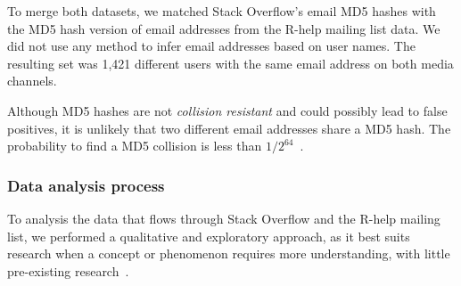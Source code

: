 \documentclass{sig-alternate-05-2015}
\begin{document}

To merge both datasets, we matched Stack Overflow's email MD5 hashes with the MD5 hash version of email addresses from the R-help mailing list data.
We did not use any method to infer email addresses based on user names.
The resulting set was 1,421 different users with the same email address on both media channels.


Although MD5 hashes are not \textit{collision resistant} and could possibly lead to false positives, it is unlikely that two different email addresses share a MD5 hash.
    The probability to find a MD5 collision is less than $1/2^{64}$~\cite{Rivest1992}.

\subsubsection{Data analysis process}
\label{sec:dap}

To analysis the data that flows through Stack Overflow and the R-help mailing list, we performed a qualitative and exploratory approach, as it best suits research when a concept or phenomenon requires more understanding, with little pre-existing research~\cite{Creswell2009}.
\end{document}

